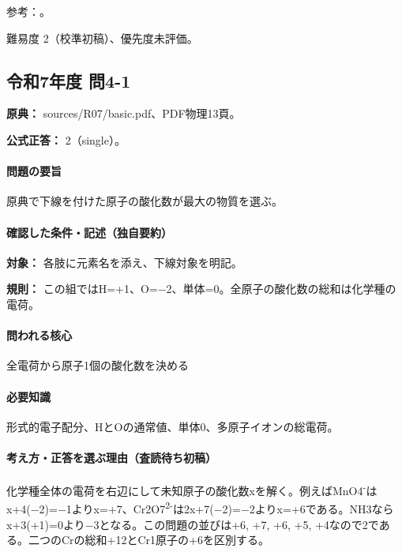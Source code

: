 \par 参考：\cite{iupac_oxidation_state}。

\par 難易度 2（校準初稿）、優先度未評価。

\subsection{令和7年度 問4-1}
\label{q:r07-reg-basic-4-1}

\noindent\textbf{原典：} sources/R07/basic.pdf、PDF物理13頁。

\textbf{公式正答：} 2（single）。

\paragraph{問題の要旨} 原典で下線を付けた原子の酸化数が最大の物質を選ぶ。

\paragraph{確認した条件・記述（独自要約）}\mbox{}\par

\noindent\textbf{対象：} 各肢に元素名を添え、下線対象を明記。\par

\noindent\textbf{規則：} この組ではH=+1、O=−2、単体=0。全原子の酸化数の総和は化学種の電荷。\par

\paragraph{問われる核心} 全電荷から原子1個の酸化数を決める

\paragraph{必要知識} 形式的電子配分、HとOの通常値、単体0、多原子イオンの総電荷。

\paragraph{考え方・正答を選ぶ理由（査読待ち初稿）} 化学種全体の電荷を右辺にして未知原子の酸化数xを解く。例えばMnO4\textsuperscript{-}はx+4(−2)=−1よりx=+7、Cr2O7\textsuperscript{2-}は2x+7(−2)=−2よりx=+6である。NH3ならx+3(+1)=\allowbreak{}0より−3となる。この問題の並びは+6, +7, +6, +5, +4なので2である。二つのCrの総和+12とCr1原子の+6を区別する。

